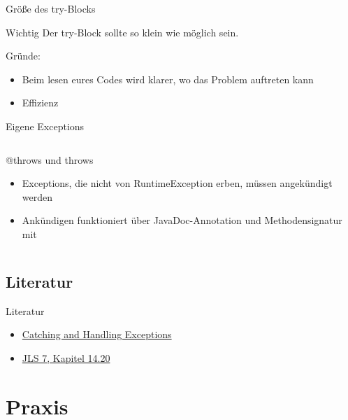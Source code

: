 \documentclass[usepdftitle=false,hyperref={pdfpagelabels=false}]{beamer}
\begin{document}
\begin{frame}{Größe des try-Blocks}
    \begin{block}{Wichtig}
        Der try-Block sollte so klein wie möglich sein.
    \end{block}

    Gründe:
    \begin{itemize}
        \item Beim lesen eures Codes wird klarer, wo das Problem 
              auftreten kann
        \item Effizienz
    \end{itemize}
\end{frame}

\begin{frame}{Eigene Exceptions}
    \inputminted[linenos=true, numbersep=5pt, tabsize=4, fontsize=\small, label=UniverseExplodeException.java, frame=lines]{java}{UniverseExplodeException.java}
\end{frame}

\begin{frame}{@throws und throws}
    \begin{itemize}
        \item Exceptions, die nicht von RuntimeException erben, müssen angekündigt werden
        \item Ankündigen funktioniert über JavaDoc-Annotation  und Methodensignatur mit 
    \end{itemize}

   \inputminted[linenos=false, numbersep=5pt, tabsize=4, fontsize=\small, firstline=11, lastline=21]{java}{singleLines.java}
\end{frame}

\subsection{Literatur}
\begin{frame}{Literatur}
    \begin{itemize}
        \item \href{http://docs.oracle.com/javase/tutorial/essential/exceptions/handling.html}{Catching and Handling Exceptions}
        \item \href{http://docs.oracle.com/javase/specs/jls/se7/html/jls-14.html\#jls-14.20}{JLS 7, Kapitel 14.20}
    \end{itemize}
\end{frame}

\section{Praxis}
\end{document}
